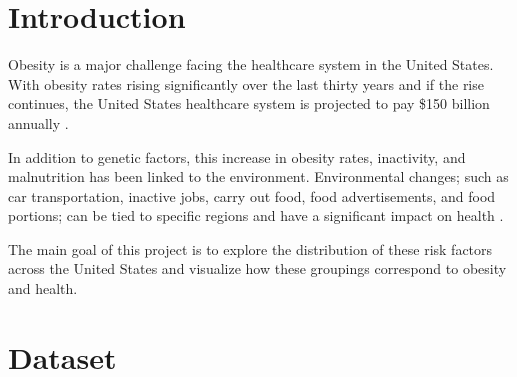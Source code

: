 \documentclass{article}
\begin{document}
 



\section{Introduction}
\label{introduction}

Obesity is a major challenge facing the healthcare system in the United States. With obesity rates rising significantly over the last thirty years and if the rise continues, the United States healthcare system is projected to pay \$150 billion annually \cite{hurt2010obesity}.

In addition to genetic factors, this increase in obesity rates, inactivity, and malnutrition has been linked to the environment. 
Environmental changes; such as car transportation, inactive jobs, carry out food, food advertisements, and food portions; can be tied to specific regions and have a significant impact on health \cite{whyobesityhealthproblem, understandingadultoverweight}. 

The main goal of this project is to explore the distribution of these risk factors across the United States and visualize how these groupings correspond to obesity and health.

\section{Dataset}
\label{dataset}
\end{document}
